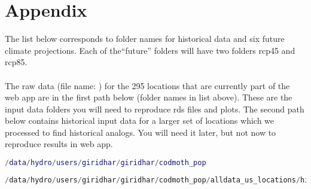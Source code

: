 \section{Appendix}
The list below corresponds to folder names for historical data and six future climate projections. Each of the``future'' folders will have two folders rcp45 and rcp85.\\

 
\\

The raw data (file name: ) for 
the 295 locations that are currently part of the web 
app are in the first path below (folder names in list above). 
 These are the input data folders you will need 
 to reproduce rds files and plots.  The second 
 path below contains historical input data for 
 a larger set of locations which we processed 
 to find historical analogs. You will need it later, 
 but not now to reproduce results in web app. 

 \scriptsize \begin{lstlisting}[backgroundcolor = \color{lightgray},
                   language = matlab,
                   xleftmargin = .5cm,
                   xrightmargin = 5.9cm,
                   framexleftmargin = .05cm]
 /data/hydro/users/giridhar/giridhar/codmoth_pop
\end{lstlisting}

\scriptsize \begin{lstlisting}[backgroundcolor = \color{lightgray},
                   language = C,
                   xleftmargin = .5cm,
                   framexleftmargin = .05cm]
 /data/hydro/users/giridhar/giridhar/codmoth_pop/alldata_us_locations/historical
\end{lstlisting}